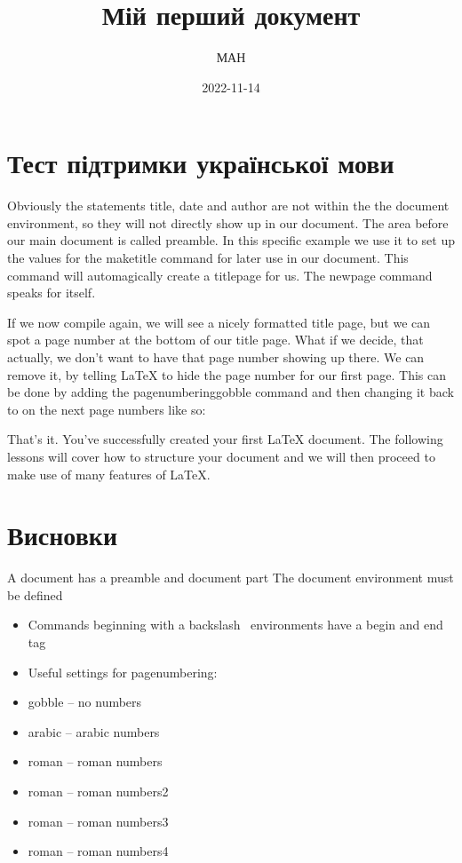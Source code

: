 \documentclass{article}
\title{Мій перший документ}
\date{2022-11-14}
\author{МАН }
\begin{document}
	\maketitle
	\newpage
	
\section{Тест підтримки української мови}
	
Obviously the statements title, date and author are not within the the document environment, so they will not directly show up in our document. The area before our main document is called preamble. In this specific example we use it to set up the values for the maketitle command for later use in our document. This command will automagically create a titlepage for us. The newpage command speaks for itself.

If we now compile again, we will see a nicely formatted title page, but we can spot a page number at the bottom of our title page. What if we decide, that actually, we don’t want to have that page number showing up there. We can remove it, by telling LaTeX to hide the page number for our first page. This can be done by adding the pagenumbering{gobble} command and then changing it back to  on the next page numbers like so:



That’s it. You’ve successfully created your first LaTeX document. The following lessons will cover how to structure your document and we will then proceed to make use of many features of LaTeX.

\section*{Висновки}

A document has a preamble and document part
The document environment must be defined
\begin{itemize}
	\item Commands beginning with a backslash \, environments have a begin and end tag
	\item Useful settings for pagenumbering:
	\item gobble – no numbers
	\item arabic – arabic numbers
	\item roman – roman numbers
	\item roman – roman numbers2
	\item roman – roman numbers3
	\item roman – roman numbers4
\end{itemize}
\end{document}
